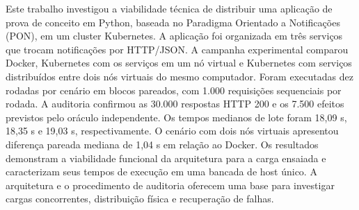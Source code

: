 \begin{resumoutfpr}
Este trabalho investigou a viabilidade técnica de distribuir uma aplicação de prova de conceito em Python, baseada no Paradigma Orientado a Notificações (PON), em um cluster Kubernetes. A aplicação foi organizada em três serviços que trocam notificações por HTTP/JSON. A campanha experimental comparou Docker, Kubernetes com os serviços em um nó virtual e Kubernetes com serviços distribuídos entre dois nós virtuais do mesmo computador. Foram executadas dez rodadas por cenário em blocos pareados, com 1.000 requisições sequenciais por rodada. A auditoria confirmou as 30.000 respostas HTTP 200 e os 7.500 efeitos previstos pelo oráculo independente. Os tempos medianos de lote foram 18,09 s, 18,35 s e 19,03 s, respectivamente. O cenário com dois nós virtuais apresentou diferença pareada mediana de 1,04 s em relação ao Docker. Os resultados demonstram a viabilidade funcional da arquitetura para a carga ensaiada e caracterizam seus tempos de execução em uma bancada de host único. A arquitetura e o procedimento de auditoria oferecem uma base para investigar cargas concorrentes, distribuição física e recuperação de falhas.
\end{resumoutfpr}
